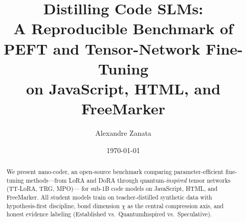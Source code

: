\documentclass[11pt,a4paper]{article}
\title{Distilling Code SLMs:\\
A Reproducible Benchmark of PEFT and Tensor-Network Fine-Tuning\\
on JavaScript, HTML, and FreeMarker}
\author{Alexandre Zanata}
\date{\today}
\begin{document}
\maketitle

\begin{abstract}
We present nano-coder, an open-source benchmark comparing parameter-efficient fine-tuning
methods---from LoRA and DoRA through quantum-\emph{inspired} tensor networks (TT-LoRA, TRG, MPO)---
for sub-1B code models on JavaScript, HTML, and FreeMarker.
All student models train on teacher-distilled synthetic data with hypothesis-first discipline,
bond dimension $\chi$ as the central compression axis, and honest evidence labeling
(Established vs.\ QuantumInspired vs.\ Speculative).
\end{abstract}









\end{document}
